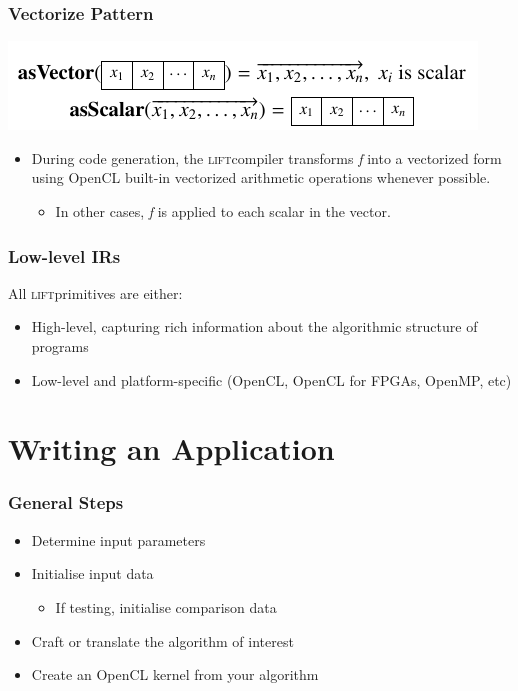 \documentclass[10pt]{beamer}
\newcommand{\lift}{\textsc{lift}\space}
\begin{document}
\begin{frame}
\frametitle{Vectorize Pattern}
    \begin{block}{}
        \begin{center}
            \includegraphics[width=.85\textwidth]{../images/vectorize_pattern.pdf}
        \end{center}
    \end{block}
\begin{itemize}
    \item During code generation, the \lift compiler transforms \textit{f} into a vectorized form using OpenCL built-in vectorized arithmetic operations whenever possible.
	\begin{itemize}
	    \item In other cases, \textit{f} is applied to each scalar in the vector.
    \end{itemize}
\end{itemize}
\end{frame}

\begin{frame}
\frametitle{Low-level IRs}
All \lift primitives are either:
\begin{itemize}
	\item High-level, capturing rich information about the algorithmic structure of programs
	\item Low-level and platform-specific (OpenCL, OpenCL for FPGAs, OpenMP, etc)
\end{itemize}
\end{frame}

\section{Writing an Application}

\begin{frame}
\frametitle{General Steps}
\begin{itemize}
    \item Determine input parameters 
    \item Initialise input data 
            \begin{itemize}
                \item If testing, initialise comparison data 
            \end{itemize}
    \item Craft or translate the algorithm of interest 
    \item Create an OpenCL kernel from your algorithm 
\end{itemize}
\end{frame}
\end{document}
